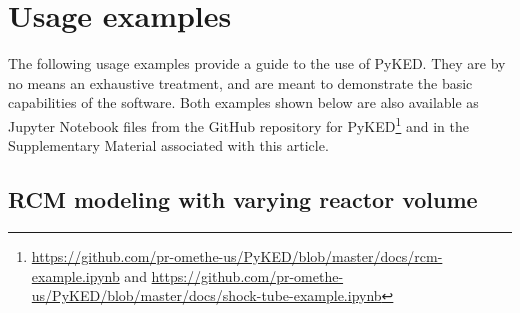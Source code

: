 \documentclass[12pt]{ijck}
\newcommand\pk{PyKED}
\begin{document}
\section{Usage examples}
\label{sec:usage-example}

The following usage examples provide a guide to the use of \pk{}. They are by no means an exhaustive
treatment, and are meant to demonstrate the basic capabilities of the software. Both examples shown
below are also available as Jupyter Notebook files from the GitHub repository for
PyKED\footnote{\url{https://github.com/pr-omethe-us/PyKED/blob/master/docs/rcm-example.ipynb} and
\url{https://github.com/pr-omethe-us/PyKED/blob/master/docs/shock-tube-example.ipynb}} and in the
Supplementary Material associated with this article.

\subsection{RCM modeling with varying reactor volume}
\label{sec:rcm-modeling}
\end{document}
